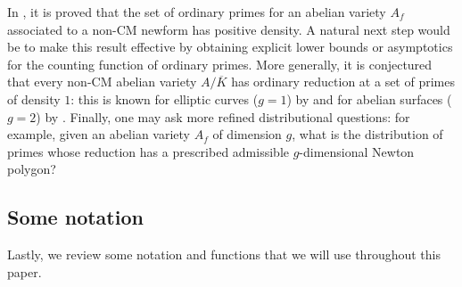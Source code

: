 \documentclass[11pt,letterpaper,reqno]{amsart}
\theoremstyle{definition}
\numberwithin{equation}{section}
\numberwithin{figure}{section}
\numberwithin{table}{section}
\let\subsectiontemp\subsection
\renewcommand{\subsection}[1]{ 
    \subsectiontemp{#1} \hfill\vspace{0.5\linespacing} 
}
\begin{document}
In \cite{wangzhang2025}, it is proved that the set of ordinary primes for an abelian variety $A_f$ associated to a non-CM newform has positive density. A natural next step would be to make this result effective by obtaining explicit lower bounds or asymptotics for the counting function of ordinary primes. More generally, it is conjectured that every non-CM abelian variety $A/\overline{K}$ has ordinary reduction at a set of primes of density $1$: this is known for elliptic curves ($g=1$) by \cite{DMOS82} and for abelian surfaces ($g=2$) by \cite{Sawin2016}. Finally, one may ask more refined distributional questions: for example, given an abelian variety $A_f$ of dimension $g$, what is the distribution of primes whose reduction has a prescribed admissible $g$-dimensional Newton polygon?

\subsection{Some notation}

Lastly, we review some notation and functions that we will use throughout this paper.
\end{document}
